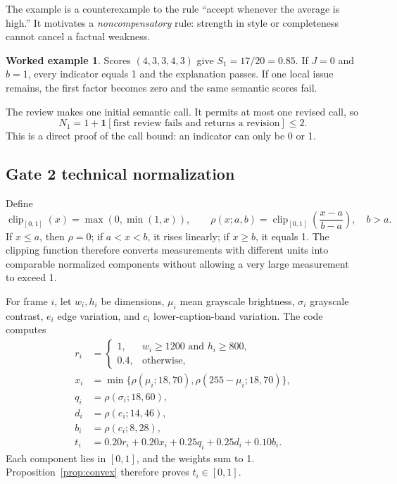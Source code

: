 \documentclass[11pt]{article}
\newcommand{\ind}[1]{\mathbf{1}\!\left[#1\right]}
\newcommand{\clip}{\operatorname{clip}_{[0,1]}}
\theoremstyle{plain}
\theoremstyle{definition}
\newtheorem{workedexample}[proposition]{Worked example}
\begin{document}
The example is a counterexample to the rule ``accept whenever the average is high.'' It motivates a \emph{noncompensatory} rule: strength in style or completeness cannot cancel a factual weakness.

\begin{workedexample}
Scores $(4,3,3,4,3)$ give $S_1=17/20=0.85$. If $J=0$ and $b=1$, every indicator equals 1 and the explanation passes. If one local issue remains, the first factor becomes zero and the same semantic scores fail.
\end{workedexample}

The review makes one initial semantic call. It permits at most one revised call, so
\begin{equation}
N_{1}=1+\ind{\text{first review fails and returns a revision}}\le2.
\end{equation}
This is a direct proof of the call bound: an indicator can only be 0 or 1.

\subsection{Gate 2 technical normalization}

Define
\begin{equation}
\clip(x)=\max(0,\min(1,x)),\qquad
\rho(x;a,b)=\clip\left(\frac{x-a}{b-a}\right),\quad b>a.
\end{equation}
If $x\le a$, then $\rho=0$; if $a<x<b$, it rises linearly; if $x\ge b$, it equals 1. The clipping function therefore converts measurements with different units into comparable normalized components without allowing a very large measurement to exceed 1.

For frame $i$, let $w_i,h_i$ be dimensions, $\mu_i$ mean grayscale brightness, $\sigma_i$ grayscale contrast, $e_i$ edge variation, and $c_i$ lower-caption-band variation. The code computes
\begin{align}
r_i &= \begin{cases}1,&w_i\ge1200\text{ and }h_i\ge800,\\0.4,&\text{otherwise},\end{cases}\\
x_i &= \min\{\rho(\mu_i;18,70),\rho(255-\mu_i;18,70)\},\\
q_i &= \rho(\sigma_i;18,60),\\
d_i &= \rho(e_i;14,46),\\
b_i &= \rho(c_i;8,28),\\
t_i &=0.20r_i+0.20x_i+0.25q_i+0.25d_i+0.10b_i.
\label{eq:technical-frame}
\end{align}
Each component lies in $[0,1]$, and the weights sum to 1. Proposition~\ref{prop:convex} therefore proves $t_i\in[0,1]$.
\end{document}
